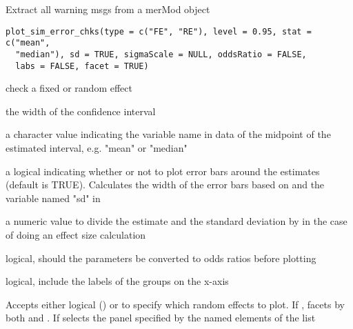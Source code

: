\documentclass[letterpaper]{book}
\begin{document}
%
\begin{Description}\relax
Extract all warning msgs from a merMod object
\end{Description}
%
\begin{Usage}
\begin{verbatim}
plot_sim_error_chks(type = c("FE", "RE"), level = 0.95, stat = c("mean",
  "median"), sd = TRUE, sigmaScale = NULL, oddsRatio = FALSE,
  labs = FALSE, facet = TRUE)
\end{verbatim}
\end{Usage}
%
\begin{Arguments}
\begin{ldescription}
\item[\code{type}] check a fixed or random effect

\item[\code{level}] the width of the confidence interval

\item[\code{stat}] a character value indicating the variable name in data of the
midpoint of the estimated interval, e.g. "mean" or "median"

\item[\code{sd}] a logical indicating whether or not to plot error bars around
the estimates (default is TRUE). Calculates the width of the error bars
based on  and the variable named "sd" in 

\item[\code{sigmaScale}] a numeric value to divide the estimate and the standard
deviation by in the case of doing an effect size calculation

\item[\code{oddsRatio}] logical, should the parameters be converted to odds ratios
before plotting

\item[\code{labs}] logical, include the labels of the groups on the x-axis

\item[\code{facet}] Accepts either logical () or  to specify which
random effects to plot. If , facets by both  and .
If  selects the panel specified by the named elements of the list
\end{ldescription}
\end{Arguments}
\end{document}
